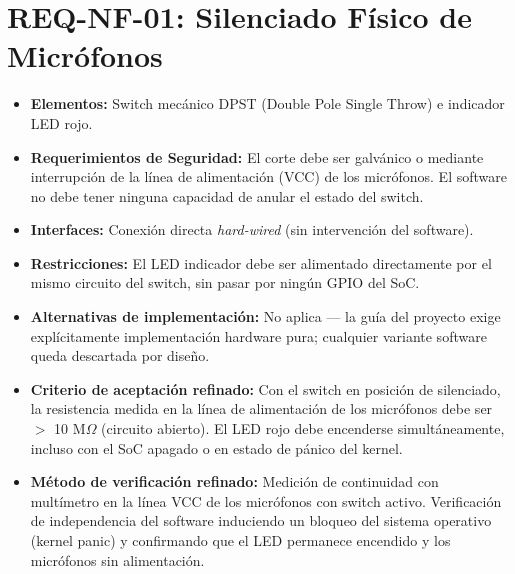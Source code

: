 \documentclass[%
	paper=a4,
	twoside=false,
	parskip=half,
	chapterprefix=false,
	10pt,
	headings=normal,
	bibliography=totoc,
	listof=totoc,
	titlepage=on,
	captions=tableabove,
	draft=false, 
]{scrbook}%
\begin{document}
\section{REQ-NF-01: Silenciado Físico de Micrófonos}
\begin{itemize}
    \item \textbf{Elementos:} Switch mecánico DPST (Double Pole Single Throw) e indicador LED rojo.
    \item \textbf{Requerimientos de Seguridad:} El corte debe ser galvánico o mediante interrupción de la línea de alimentación (VCC) de los micrófonos. El software no debe tener ninguna capacidad de anular el estado del switch.
    \item \textbf{Interfaces:} Conexión directa \textit{hard-wired} (sin intervención del software).
    \item \textbf{Restricciones:} El LED indicador debe ser alimentado directamente por el mismo circuito del switch, sin pasar por ningún GPIO del SoC.
    \item \textbf{Alternativas de implementación:} No aplica — la guía del proyecto exige explícitamente implementación hardware pura; cualquier variante software queda descartada por diseño.
    \item \textbf{Criterio de aceptación refinado:} Con el switch en posición de silenciado, la resistencia medida en la línea de alimentación de los micrófonos debe ser $>$ 10 M$\Omega$ (circuito abierto). El LED rojo debe encenderse simultáneamente, incluso con el SoC apagado o en estado de pánico del kernel.
    \item \textbf{Método de verificación refinado:} Medición de continuidad con multímetro en la línea VCC de los micrófonos con switch activo. Verificación de independencia del software induciendo un bloqueo del sistema operativo (kernel panic) y confirmando que el LED permanece encendido y los micrófonos sin alimentación.
\end{itemize}

\end{document}

